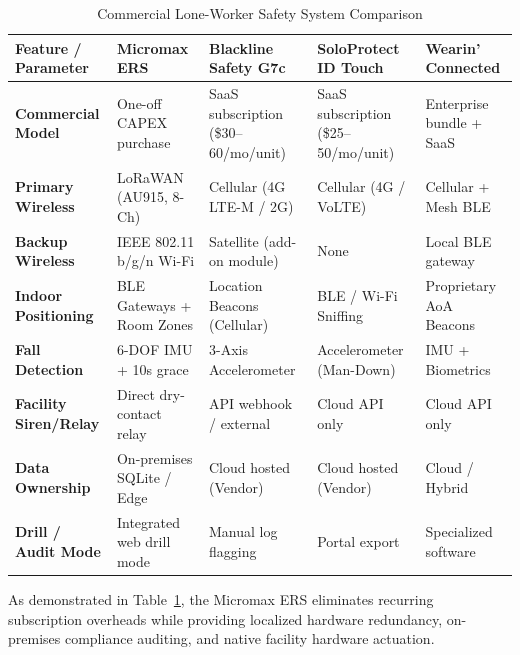 \begin{table}[htbp]
    \centering
    \caption{Commercial Lone-Worker Safety System Comparison}
    \label{tab:competitive_benchmark}
    \begin{tabularx}{\textwidth}{l X X X X}
        \toprule
        \textbf{Feature / Parameter} & \textbf{Micromax ERS} & \textbf{Blackline Safety G7c} & \textbf{SoloProtect ID Touch} & \textbf{Wearin' Connected} \\
        \midrule
        \textbf{Commercial Model} & One-off CAPEX purchase & SaaS subscription (\$30--60/mo/unit) & SaaS subscription (\$25--50/mo/unit) & Enterprise bundle + SaaS \\
        \textbf{Primary Wireless} & LoRaWAN (AU915, 8-Ch) & Cellular (4G LTE-M / 2G) & Cellular (4G / VoLTE) & Cellular + Mesh BLE \\
        \textbf{Backup Wireless} & IEEE 802.11 b/g/n Wi-Fi & Satellite (add-on module) & None & Local BLE gateway \\
        \textbf{Indoor Positioning} & BLE Gateways + Room Zones & Location Beacons (Cellular) & BLE / Wi-Fi Sniffing & Proprietary AoA Beacons \\
        \textbf{Fall Detection} & 6-DOF IMU + 10s grace & 3-Axis Accelerometer & Accelerometer (Man-Down) & IMU + Biometrics \\
        \textbf{Facility Siren/Relay} & Direct dry-contact relay & API webhook / external & Cloud API only & Cloud API only \\
        \textbf{Data Ownership} & On-premises SQLite / Edge & Cloud hosted (Vendor) & Cloud hosted (Vendor) & Cloud / Hybrid \\
        \textbf{Drill / Audit Mode} & Integrated web drill mode & Manual log flagging & Portal export & Specialized software \\
        \bottomrule
    \end{tabularx}
\end{table}

As demonstrated in Table~\ref{tab:competitive_benchmark}, the Micromax ERS eliminates recurring subscription overheads while providing localized hardware redundancy, on-premises compliance auditing, and native facility hardware actuation.

